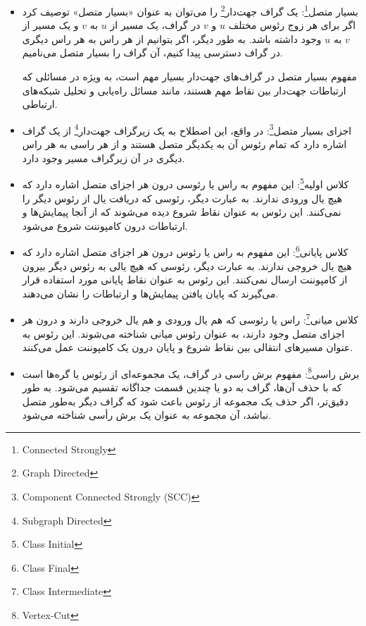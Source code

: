 \documentclass[a4paper,10pt]{article}
\begin{document}
\begin{itemize}
        \item بسیار متصل\footnote{\hspace{2pt}Connected Strongly}: یک گراف جهت‌دار\footnote{\hspace{2pt}Graph Directed} را می‌توان به عنوان «بسیار متصل» توصیف کرد اگر برای هر زوج رئوس مختلف $u$ و $v$ در گراف، یک مسیر از $u$ به $v$ و یک مسیر از $v$ به $u$ وجود داشته باشد. به طور دیگر، اگر بتوانیم از هر راس به هر راس دیگری در گراف دسترسی پیدا کنیم، آن گراف را بسیار متصل می‌نامیم.

        مفهوم بسیار متصل در گراف‌های جهت‌دار بسیار مهم است، به ویژه در مسائلی که ارتباطات جهت‌دار بین نقاط مهم هستند، مانند مسائل راه‌یابی و تحلیل شبکه‌های ارتباطی.

        \item اجزای بسیار متصل\footnote{\hspace{2pt}Component Connected Strongly (SCC)}: در واقع، این اصطلاح به یک زیرگراف جهت‌دار\footnote{\hspace{2pt}Subgraph Directed} از یک گراف اشاره دارد که تمام رئوس آن به یکدیگر متصل هستند و از هر راسی به هر راس دیگری در آن زیرگراف مسیر وجود دارد.

        \item کلاس اولیه\footnote{\hspace{2pt}Class Initial}: این مفهوم به راس یا رئوسی درون هر اجزای متصل اشاره دارد که هیچ یال ورودی ندارند. به عبارت دیگر، رئوسی که دریافت یال از رئوس دیگر را نمی‌کنند. این رئوس به عنوان نقاط شروع دیده می‌شوند که از آنجا پیمایش‌ها و ارتباطات درون کامپوننت شروع می‌شود.

        \item کلاس پایانی\footnote{\hspace{2pt}Class Final}: این مفهوم به راس یا رئوس درون هر اجزای متصل اشاره دارد که هیچ یال خروجی ندارند. به عبارت دیگر، رئوسی که هیچ یالی به رئوس دیگر بیرون از کامپوننت ارسال نمی‌کنند. این رئوس به عنوان نقاط پایانی مورد استفاده قرار می‌گیرند که پایان یافتن پیمایش‌ها و ارتباطات را نشان می‌دهند.
        
        \item کلاس میانی\footnote{\hspace{2pt}Class Intermediate}: راس یا رئوسی که هم یال ورودی و هم یال خروجی دارند و درون هر اجزای متصل وجود دارند، به عنوان رئوس میانی شناخته می‌شوند. این رئوس به عنوان مسیرهای انتقالی بین نقاط شروع و پایان درون یک کامپوننت عمل می‌کنند.

        \item برش راسی\footnote{\hspace{2pt}Vertex-Cut}: مفهوم برش راسی در گراف، یک مجموعه‌ای از رئوس یا گره‌ها است که با حذف آن‌ها، گراف به دو یا چندین قسمت جداگانه تقسیم می‌شود. به طور دقیق‌تر، اگر حذف یک مجموعه از رئوس باعث شود که گراف دیگر به‌طور متصل نباشد، آن مجموعه به عنوان یک برش رأسی شناخته می‌شود.
        

\end{itemize}
\end{document}
